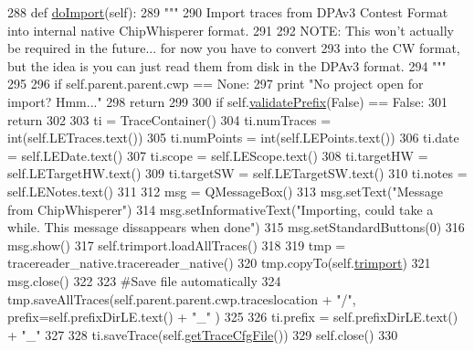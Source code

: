 \begin{DoxyCode}
288     \textcolor{keyword}{def }\hyperlink{classsoftware_1_1chipwhisperer_1_1common_1_1traces_1_1TraceContainerDPAv3_1_1ImportDPAv3Dialog_a27dcda3d2c45c033757cea03b9f67cda}{doImport}(self):
289         \textcolor{stringliteral}{"""}
290 \textcolor{stringliteral}{        Import traces from DPAv3 Contest Format into internal native ChipWhisperer format.}
291 \textcolor{stringliteral}{        }
292 \textcolor{stringliteral}{        NOTE: This won't actually be required in the future... for now you have to convert}
293 \textcolor{stringliteral}{        into the CW format, but the idea is you can just read them from disk in the DPAv3 format.}
294 \textcolor{stringliteral}{        """}
295         
296         \textcolor{keywordflow}{if} self.parent.parent.cwp == \textcolor{keywordtype}{None}:
297             \textcolor{keywordflow}{print} \textcolor{stringliteral}{"No project open for import? Hmm..."}
298             \textcolor{keywordflow}{return}
299 
300         \textcolor{keywordflow}{if} self.\hyperlink{classsoftware_1_1chipwhisperer_1_1common_1_1traces_1_1TraceContainerDPAv3_1_1ImportDPAv3Dialog_a6a1c6202537792b6007a0026ec0d2d3d}{validatePrefix}(\textcolor{keyword}{False}) == \textcolor{keyword}{False}:
301             \textcolor{keywordflow}{return}
302         
303         ti = TraceContainer()
304         ti.numTraces = int(self.LETraces.text())
305         ti.numPoints = int(self.LEPoints.text())
306         ti.date = self.LEDate.text()
307         ti.scope = self.LEScope.text()
308         ti.targetHW = self.LETargetHW.text()
309         ti.targetSW = self.LETargetSW.text()
310         ti.notes = self.LENotes.text()
311 
312         msg = QMessageBox()
313         msg.setText(\textcolor{stringliteral}{"Message from ChipWhisperer"})
314         msg.setInformativeText(\textcolor{stringliteral}{"Importing, could take a while. This message dissappears when done"})
315         msg.setStandardButtons(0)
316         msg.show()
317         self.trimport.loadAllTraces()
318     
319         tmp = tracereader\_native.tracereader\_native()
320         tmp.copyTo(self.\hyperlink{classsoftware_1_1chipwhisperer_1_1common_1_1traces_1_1TraceContainerDPAv3_1_1ImportDPAv3Dialog_a6c11dadab6221c31994f6c850fc49a4a}{trimport})
321         msg.close()
322 
323         \textcolor{comment}{#Save file automatically}
324         tmp.saveAllTraces(self.parent.parent.cwp.traceslocation + \textcolor{stringliteral}{"/"}, prefix=self.prefixDirLE.text() + \textcolor{stringliteral}{"\_"}
      )
325 
326         ti.prefix = self.prefixDirLE.text() + \textcolor{stringliteral}{"\_"}
327         
328         ti.saveTrace(self.\hyperlink{classsoftware_1_1chipwhisperer_1_1common_1_1traces_1_1TraceContainerDPAv3_1_1ImportDPAv3Dialog_ae41e4856bad7cfabb5af6bb8b4638571}{getTraceCfgFile}())     
329         self.close()
330 \end{DoxyCode}
